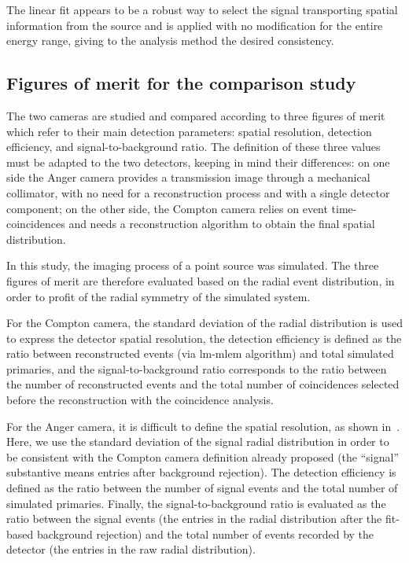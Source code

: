 The linear fit appears to be a robust way to select the signal transporting spatial information from the source and is applied with no modification for the entire energy range, giving to the analysis method the desired consistency.

\subsection{Figures of merit for the comparison study}\label{chap5::subsec::fom}

The two cameras are studied and compared according to three figures of merit which refer to their main detection parameters: spatial resolution, detection efficiency, and signal-to-background ratio. The definition of these three values must be adapted to the two detectors, keeping in mind their differences: on one side the Anger camera provides a transmission image through a mechanical collimator, with no need for a reconstruction process and with a single detector component; on the other side, the Compton camera relies on event time-coincidences and needs a reconstruction algorithm to obtain the final spatial distribution.

In this study, the imaging process of a point source was simulated. The three figures of merit are therefore evaluated based on the radial event distribution, in order to profit of the radial symmetry of the simulated system.

For the Compton camera, the standard deviation of the radial distribution is used to express the detector spatial resolution, the detection efficiency is defined as the ratio between reconstructed events (via \gls{lm-mlem} algorithm) and total simulated primaries, and the signal-to-background ratio corresponds to the ratio between the number of reconstructed events and the total number of coincidences selected before the reconstruction with the coincidence analysis.

For the Anger camera, it is difficult to define the spatial resolution, as shown in~\parencite{Cecchin2015}. Here, we use the standard deviation of the signal radial distribution in order to be consistent with the Compton camera definition already proposed (the \enquote{signal} substantive means entries after background rejection). The detection efficiency is defined as the ratio between the number of signal events and the total number of simulated primaries. Finally, the signal-to-background ratio is evaluated as the ratio between the signal events (the entries in the radial distribution after the fit-based background rejection) and the total number of events recorded by the detector (the entries in the raw radial distribution).

